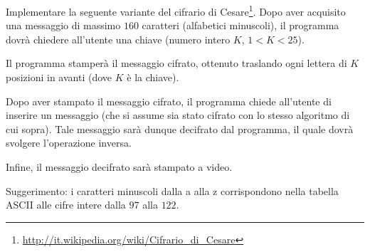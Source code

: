 \begin{Exercise}[label={ex:cesare}]
		Implementare la seguente variante del cifrario di Cesare\footnote{\url{http://it.wikipedia.org/wiki/Cifrario_di_Cesare}}. Dopo aver acquisito una messaggio di massimo $160$ caratteri (alfabetici minuscoli), il programma dovr\`a chiedere all'utente una chiave (numero intero $K$, $1 < K < 25$).

  	Il programma stamper\`a il messaggio cifrato, ottenuto traslando ogni lettera di $K$ posizioni in avanti (dove $K$ \`e la chiave).

  	Dopo aver stampato il messaggio cifrato, il programma chiede all'utente di inserire un messaggio (che si assume sia stato cifrato con lo stesso algoritmo di cui sopra). Tale messaggio sar\`a dunque decifrato dal programma, il quale dovr\`a svolgere l'operazione inversa.

  	Infine, il messaggio decifrato sar\`a stampato a video.
		
		Suggerimento: i caratteri minuscoli dalla a alla z corrispondono nella tabella ASCII alle cifre intere dalla $97$ alla $122$.
\end{Exercise}

\begin{Answer}[ref={ex:cesare}]
  
\end{Answer}